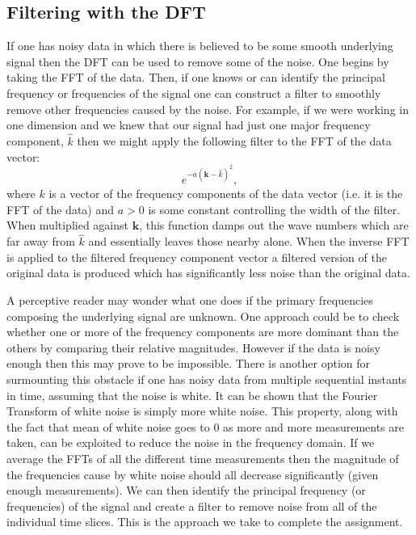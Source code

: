 \documentclass[fleqn,10pt]{SelfArx} %
\begin{document}
\subsection{Filtering with the DFT}
If one has noisy data in which there is believed to be some smooth underlying signal then the DFT can be used to remove some of the noise. One begins by taking the FFT of the data. Then, if one knows or can identify the principal frequency or frequencies of the signal one can construct a filter to smoothly remove other frequencies caused by the noise. For example, if we were working in one dimension and we knew that our signal had just one major frequency component, $\hat k$ then we might apply the following filter to the FFT of the data vector:
\begin{equation}
	e^{-a(\boldsymbol{k}-\hat k)^2},
\end{equation}
where $k$ is a vector of the frequency components of the data vector (i.e. it is the FFT of the data) and $a>0$ is some constant controlling the width of the filter. When multiplied against $\boldsymbol{k}$, this function damps out the wave numbers which are far away from $\hat k$ and essentially leaves those nearby alone. When the inverse FFT is applied to the filtered frequency component vector a filtered version of the original data is produced which has significantly less noise than the original data.

A perceptive reader may wonder what one does if the primary frequencies composing the underlying signal are unknown. One approach could be to check whether one or more of the frequency components are more dominant than the others by comparing their relative magnitudes. However if the data is noisy enough then this may prove to be impossible. There is another option for surmounting this obstacle if one has noisy data from multiple sequential instants in time, assuming that the noise is white. It can be shown that the Fourier Transform of white noise is simply more white noise. This property, along with the fact that mean of white noise goes to 0 as more and more measurements are taken, can be exploited to reduce the noise in the frequency domain. If we average the FFTs of all the different time measurements then the magnitude of the frequencies cause by white noise should all decrease significantly (given enough measurements). We can then identify the principal frequency (or frequencies) of the signal and create a filter to remove noise from all of the individual time slices. This is the approach we take to complete the assignment.
\end{document}
